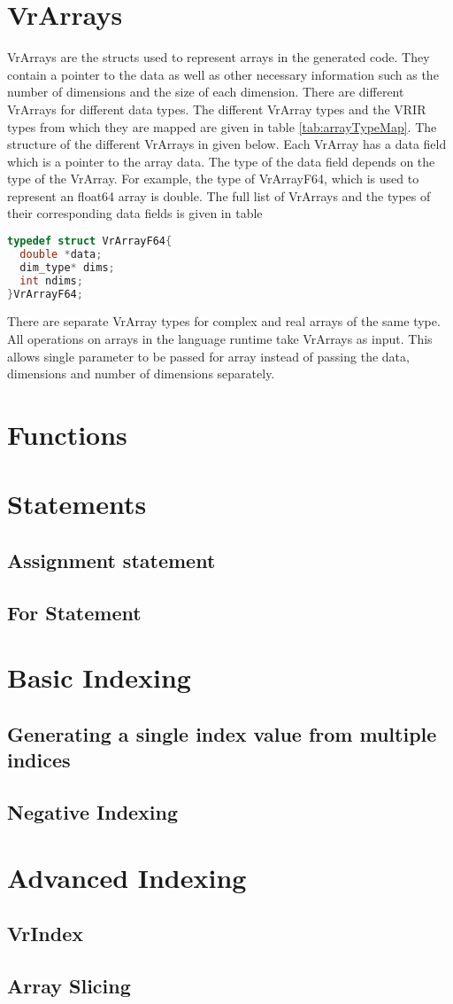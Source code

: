 \section{VrArrays}
\label{sec:vrarray}
VrArrays are the structs used to represent arrays in the generated code. They contain a pointer to the data as well as other necessary information such as the number of dimensions and the size of each dimension. There are different VrArrays for different data types. The different VrArray types and the VRIR types from which they are mapped are given in table \ref{tab:arrayTypeMap}. The structure of the different VrArrays in given below. Each VrArray has a data field which is a pointer to the array data. The type of the data field depends on the type of the VrArray. For example, the type of VrArrayF64, which is used to represent an float64 array is double. The full list of VrArrays and the types of their corresponding data fields is given in table %
\begin{lstlisting}[language=c]
typedef struct VrArrayF64{
  double *data;
  dim_type* dims;  
  int ndims;
}VrArrayF64;
\end{lstlisting}
There are separate VrArray types for complex and real arrays of the same type. All operations on arrays in the language runtime take VrArrays as input. This allows  single parameter to be passed for array instead of passing the data, dimensions and number of dimensions separately.
\section{Functions} 
\section{Statements}
\subsection{Assignment statement}
\subsection{For Statement}
\section{Basic Indexing}
\subsection{ Generating a single index value from multiple indices}
\subsection{Negative Indexing}
\section{Advanced Indexing}
\subsection{VrIndex}
\subsection{Array Slicing}

